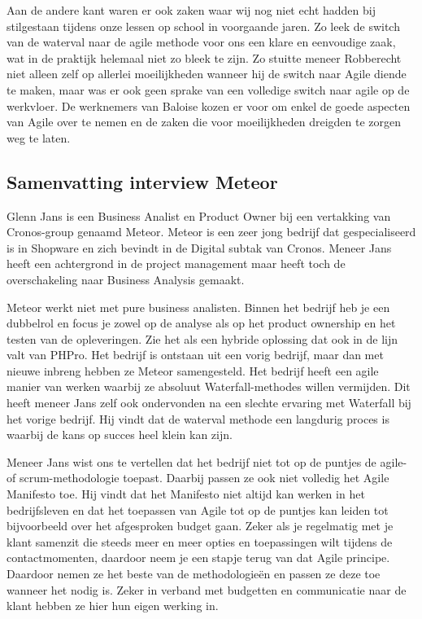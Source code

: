 \documentclass{hogent-article}
\begin{document}
Aan de andere kant waren er ook zaken waar wij nog niet echt hadden bij stilgestaan tijdens onze lessen op school in voorgaande jaren. Zo leek de switch van de waterval naar de agile methode voor ons een klare en eenvoudige zaak, wat in de praktijk helemaal niet zo bleek te zijn. Zo stuitte meneer Robberecht niet alleen zelf op allerlei moeilijkheden wanneer hij de switch naar Agile diende te maken, maar was er ook geen sprake van een volledige switch naar agile op de werkvloer. De werknemers van Baloise kozen er voor om enkel de goede aspecten van Agile over te nemen en de zaken die voor moeilijkheden dreigden te zorgen weg te laten.



\subsection{ Samenvatting interview Meteor}

Glenn Jans is een Business Analist en Product Owner bij een vertakking van Cronos-group genaamd Meteor. Meteor is een zeer jong bedrijf dat gespecialiseerd is in Shopware en zich bevindt in de Digital subtak van Cronos. Meneer Jans heeft een achtergrond in de project management maar heeft toch de overschakeling naar Business Analysis gemaakt. 

Meteor werkt niet met pure business analisten. Binnen het bedrijf heb je een dubbelrol en focus je zowel op de analyse als op het product ownership en het testen van de opleveringen. Zie het als een hybride oplossing dat ook in de lijn valt van PHPro. Het bedrijf is ontstaan uit een vorig bedrijf, maar dan met nieuwe inbreng hebben ze Meteor samengesteld. Het bedrijf heeft een agile manier van werken waarbij ze absoluut Waterfall-methodes willen vermijden. Dit heeft meneer Jans zelf ook ondervonden na een slechte ervaring met Waterfall bij het vorige bedrijf. Hij vindt dat de waterval methode een langdurig proces is waarbij de kans op succes heel klein kan zijn. 

Meneer Jans wist ons te vertellen dat het bedrijf niet tot op de puntjes de agile- of scrum-methodologie toepast. Daarbij passen ze ook niet volledig het Agile Manifesto toe. Hij vindt dat het Manifesto niet altijd kan werken in het bedrijfsleven en dat het toepassen van Agile tot op de puntjes kan leiden tot bijvoorbeeld over het afgesproken budget gaan. Zeker als je regelmatig met je klant samenzit die steeds meer en meer opties en toepassingen wilt tijdens de contactmomenten, daardoor neem je een stapje terug van dat Agile principe. Daardoor nemen ze het beste van de methodologieën en passen ze deze toe wanneer het nodig is. Zeker in verband met budgetten en communicatie naar de klant hebben ze hier hun eigen werking in.
\end{document}
